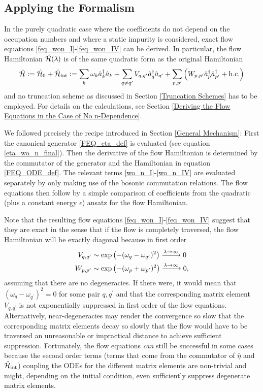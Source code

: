 \subsection{Applying the Formalism}
In the purely quadratic case where the coefficients do not depend on the occupation numbers and where a static impurity is considered, exact flow equations \ref{feq_won_I}-\ref{feq_won_IV} can be derived. In particular, the flow Hamiltonian $\hat{\mathcal{H}}(\lambda)$ is of the same quadratic form as the original Hamiltonian
\begin{equation}\label{def_purely_quadratic_hamiltonian}
\hat{\mathcal{H}} \vcentcolon= \hat{\mathcal{H}}_0+\hat{\mathcal{H}}_{\mathrm{int}} \vcentcolon= \sum\limits_k \omega_k \hat a^\dagger_k\hat a_k+\sum\limits_{q\neq q^\prime}V_{q,q^\prime}\hat a^\dagger_q\hat a_{q^\prime}+\sum\limits_{p,p^\prime}\left(W_{p,p^\prime}\hat a^\dagger_p\hat a^\dagger_{p^\prime}+\mathrm{h.c.}\right)
\end{equation}
 and no truncation scheme as discussed in Section \ref{Truncation Schemes} has to be employed. For details on the calculations, see Section \ref{Deriving the Flow Equations in the Case of No n-Dependence}.\par 
We followed precisely the recipe introduced in Section \ref{General Mechanism}: First the canonical generator \ref{FEQ_eta_def} is evaluated (see equation \ref{eta_wo_n_final}). Then the derivative of the flow Hamiltonian is determined by the commutator of the generator and the Hamiltonian in equation \ref{FEQ_ODE_def}. The relevant terms \ref{wo_n_I}-\ref{wo_n_IV} are evaluated separately by only making use of the bosonic commutation relations. The flow equations then follow by a simple comparison of coefficients from the quadratic (plus a constant energy $\epsilon$) ansatz for the flow Hamiltonian.\par
Note that the resulting flow equations \ref{feq_won_I}-\ref{feq_won_IV} suggest that they are exact in the sense that if the flow is completely traversed, the flow Hamiltonian will be exactly diagonal because in first order
\begin{subequations}
\begin{align}
V_{q,q^\prime}&\sim \exp\left(-(\omega_q-\omega_{q^\prime})^2\right)\xlongrightarrow{\lambda\rightarrow\infty}0\\
W_{p,p^\prime}&\sim \exp\left(-(\omega_p+\omega_{p^\prime})^2\right)\xlongrightarrow{\lambda\rightarrow\infty}0,
\end{align}
\end{subequations}
assuming that there are no degeneracies. If there were, it would mean that  $(\omega_q-\omega_{q^\prime})^2=0$ for some pair $q,q^\prime$ and that the corresponding matrix element $V_{q,q^\prime}$ is not exponentially suppressed in first order of the flow equations. Alternatively, near-degeneracies may render the convergence so slow that the corresponding matrix elements decay so slowly that the flow would have to be traversed an unreasonable or impractical distance to achieve sufficient suppression.  Fortunately, the flow equations \emph{can} still be successful in some cases \cite{PhysRevD.49.4214} because the second order terms (terms that come from the commutator of $\hat\eta$ and $\hat{\mathcal{H}}_{\mathrm{int}}$) coupling the ODEs for the different matrix elements are non-trivial and might, depending on the initial condition, even sufficiently suppress degenerate matrix elements.
